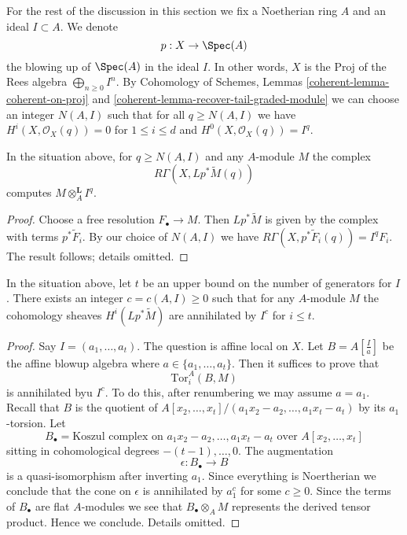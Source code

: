 \noindent
For the rest of the discussion in this section we fix a Noetherian ring $A$
and an ideal $I \subset A$. We denote
$$
p : X \to \Spec(A)
$$
the blowing up of $\Spec(A)$ in the ideal $I$. In other words, $X$ is the
$\text{Proj}$ of the Rees algebra $\bigoplus_{n \geq 0} I^n$.
By Cohomology of Schemes, Lemmas \ref{coherent-lemma-coherent-on-proj} and
\ref{coherent-lemma-recover-tail-graded-module}
we can choose an integer $N(A, I)$ such that for all $q \geq N(A, I)$
we have $H^i(X, \mathcal{O}_X(q)) = 0$ for
$1 \leq i \leq d$ and $H^0(X, \mathcal{O}_X(q)) = I^q$.

\begin{lemma}
\label{lemma-compute-tor-Iq}
In the situation above, for $q \geq N(A, I)$ and any $A$-module $M$
the complex
$$
R\Gamma(X, Lp^*\widetilde{M}(q))
$$
computes $M \otimes_A^\mathbf{L} I^q$.
\end{lemma}

\begin{proof}
Choose a free resolution $F_\bullet \to M$. Then $Lp^*\widetilde{M}$
is given by the complex with terms $p^*\widetilde{F}_i$. By our choice
of $N(A, I)$ we have $R\Gamma(X, p^*\widetilde{F}_i(q)) = I^qF_i$.
The result follows; details omitted.
\end{proof}

\begin{lemma}
\label{lemma-annihilates}
In the situation above, let $t$ be an upper bound on the number of
generators for $I$. There exists an integer $c = c(A, I) \geq 0$
such that for any $A$-module $M$ the cohomology sheaves
$H^i(Lp^*\widetilde{M})$ are annihilated by $I^c$ for $i \leq t$.
\end{lemma}

\begin{proof}
Say $I = (a_1, \ldots, a_t)$. The question is affine local on $X$.
Let $B = A[\frac{I}{a}]$ be the affine blowup algebra where
$a \in \{a_1, \ldots, a_t\}$. Then it suffices to prove that
$$
\text{Tor}_i^A(B, M)
$$
is annihilated byu $I^c$. To do this, after renumbering we may assume
$a = a_1$. Recall that $B$ is the quotient of
$A[x_2, \ldots, x_t]/(a_1x_2 - a_2, \ldots, a_1x_t - a_t)$
by its $a_1$-torsion. Let
$$
B_\bullet = \text{Koszul complex on }a_1x_2 - a_2, \ldots, a_1x_t - a_t
\text{ over }A[x_2, \ldots, x_t]
$$
sitting in cohomological degrees $-(t - 1), \ldots, 0$. The augmentation
$$
\epsilon : B_\bullet \longrightarrow B
$$
is a quasi-isomorphism after inverting $a_1$. Since everything is Noertherian
we conclude that the cone on $\epsilon$ is annihilated by $a_1^c$ for some
$c \geq 0$. Since the terms of $B_\bullet$ are flat $A$-modules we see
that $B_\bullet \otimes_A M$ represents the derived tensor product.
Hence we conclude. Details omitted.
\end{proof}

